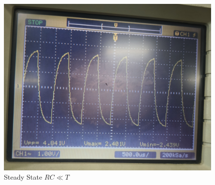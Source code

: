 \documentclass[12pt,a4paper]{report}
\begin{document}
\begin{itemize}
\begin{figure}[H]
\begin{minipage}[c]{0.48\textwidth}
    \end{minipage}
    \hfill
    \begin{minipage}[c]{0.48\textwidth}
        \includegraphics[width=\textwidth]{figs/sr2.jpg} %
        
    \end{minipage}
    \caption{Steady State $RC \ll T$}
    \label{fig:CRO-patterns}
\end{figure}
\end{itemize}
\end{document}
